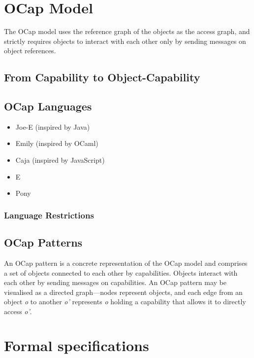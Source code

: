 \documentclass[a4paper,11pt, twoside,twocolumn]{article}
\begin{document}
\section{OCap Model}
The OCap model uses the reference graph of the objects as the access graph, and strictly requires objects to interact with each other only by sending messages on object references\cite{miller2003b}.
\subsection{From Capability to Object-Capability}
\subsection{OCap Languages}
\begin{itemize}
\item Joe-E (inspired by Java)
\item Emily (inspired by OCaml)
\item Caja (inspired by JavaScript)
\item E
\item Pony
\end{itemize}
\subsubsection{Language Restrictions}
\subsection{OCap Patterns}
An OCap pattern is a concrete representation of the OCap model and comprises a set of objects connected to each other by capabilities. Objects interact with each other by sending messages on capabilities. An OCap pattern may be visualised as a directed graph---nodes represent objects, and each edge from an object \textit{o} to another \textit{o'} represents \textit{o} holding a capability that allows it to directly access \textit{o'}.
\section{Formal specifications}
\end{document}

